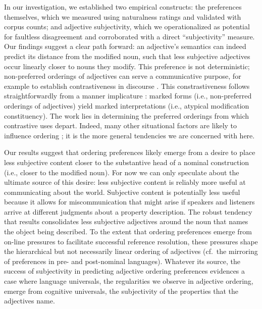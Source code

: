 \documentclass{pnastwo}
\begin{document}
\begin{article}
In our investigation, we established two empirical constructs: the preferences themselves, which we measured using naturalness ratings and validated with corpus counts; and adjective subjectivity, which we operationalized as potential for faultless disagreement and corroborated with a direct ``subjectivity'' measure. 
Our findings suggest a clear path forward: an adjective's semantics can indeed predict its distance from the modified noun, such that less subjective adjectives occur linearly closer to nouns they modify. This preference is not deterministic; non-preferred orderings of adjectives can serve a communicative purpose, for example to establish contrastiveness in discourse \cite{martin1969determinants,martin1970juncture,hill1960,vendler1963}. This constrastiveness follows straightforwardly from a manner implicature \cite{levinson2000}: marked forms (i.e., non-preferred orderings of adjectives) yield marked interpretations (i.e., atypical modification constituency). The work lies in determining the preferred orderings from which  contrastive uses depart. Indeed, many other situational factors are likely to influence ordering \cite{wulff2003}; it is the more general tendencies we are concerned with here.

Our results suggest that ordering preferences likely emerge from a desire to place less subjective content closer to the substantive head of a nominal construction (i.e., closer to the modified noun). For now we can only speculate about the ultimate source of this desire: less subjective content is reliably more useful at communicating about the world. Subjective content is potentially less useful because it allows for miscommunication that might arise if speakers and listeners arrive at different judgments about a property description. The robust tendency that results consolidates less subjective adjectives around the noun that names the object being described. To the extent that ordering preferences emerge from on-line pressures to facilitate successful reference resolution, these pressures shape the hierarchical but not necessarily linear ordering of adjectives (cf.~the mirroring of preferences in pre- and post-nominal languages). Whatever its source, the success of subjectivity in predicting adjective ordering preferences evidences a case where language universals, the regularities we observe in adjective ordering, emerge from cognitive universals, the subjectivity of the properties that the adjectives name.


\end{article}
\end{document}
